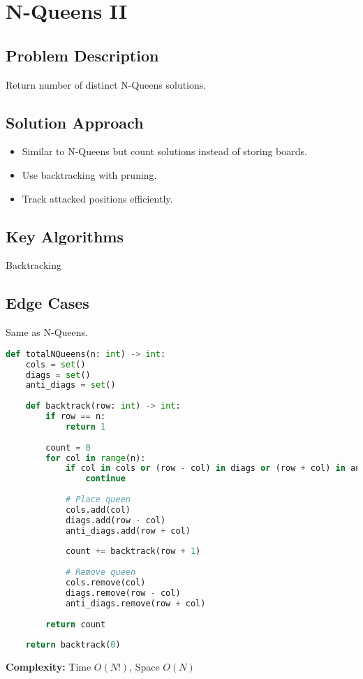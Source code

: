 \documentclass[10pt, a4paper]{article}
\begin{document}
\section{N-Queens II}
\subsection*{Problem Description}
Return number of distinct N-Queens solutions.

\subsection*{Solution Approach}
\begin{itemize}
    \item Similar to N-Queens but count solutions instead of storing boards.
    \item Use backtracking with pruning.
    \item Track attacked positions efficiently.
\end{itemize}

\subsection*{Key Algorithms}
Backtracking

\subsection*{Edge Cases}
Same as N-Queens.

\begin{lstlisting}[language=Python]
def totalNQueens(n: int) -> int:
    cols = set()
    diags = set()
    anti_diags = set()
    
    def backtrack(row: int) -> int:
        if row == n:
            return 1
        
        count = 0
        for col in range(n):
            if col in cols or (row - col) in diags or (row + col) in anti_diags:
                continue
            
            # Place queen
            cols.add(col)
            diags.add(row - col)
            anti_diags.add(row + col)
            
            count += backtrack(row + 1)
            
            # Remove queen
            cols.remove(col)
            diags.remove(row - col)
            anti_diags.remove(row + col)
        
        return count
    
    return backtrack(0)
\end{lstlisting}
\textbf{Complexity:} Time $O(N!)$, Space $O(N)$
\end{document}

